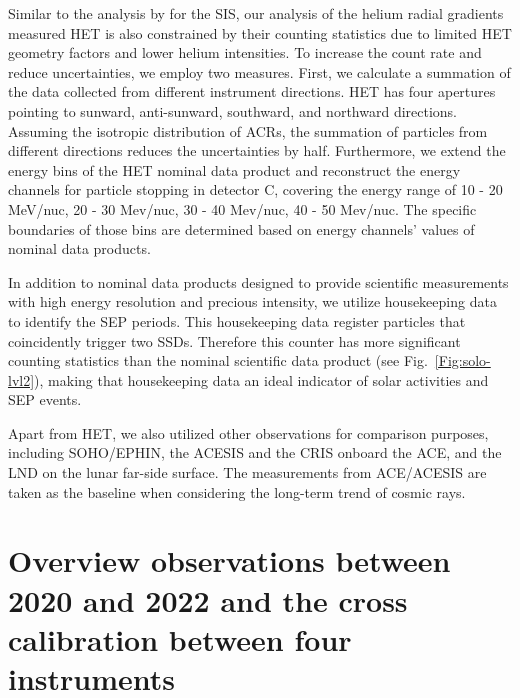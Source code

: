 Similar to the analysis by \citet{Mason-2021-SolOQuietTime} for the \ac{SIS}, our analysis of the helium radial gradients measured \ac{HET} is also constrained by their counting statistics due to limited \ac{HET} geometry factors and lower helium intensities. To increase the count rate and reduce uncertainties, we employ two measures. First, we calculate a summation of the data collected from different instrument directions. \ac{HET} has four apertures pointing to sunward, anti-sunward, southward, and northward directions. Assuming the isotropic distribution of \acp{ACR}, the summation of particles from different directions reduces the uncertainties by half. Furthermore, we extend the energy bins of the \ac{HET} nominal data product and reconstruct the energy channels for particle stopping in detector C, covering the energy range of 10 - 20 MeV/nuc, 20 - 30 Mev/nuc, 30 - 40 Mev/nuc, 40 - 50 Mev/nuc. The specific boundaries of those bins are determined based on energy channels' values of nominal data products.

In addition to nominal data products designed to provide scientific measurements with high energy resolution and precious intensity, we utilize housekeeping data to identify the \ac{SEP} periods. This housekeeping data register particles that coincidently trigger two \acp{SSD}. Therefore this counter has more significant counting statistics than the nominal scientific data product (see Fig.~\ref{Fig:solo-lvl2}), making that housekeeping data an ideal indicator of solar activities and \ac{SEP} events. 



Apart from \ac{HET}, we also utilized other observations for comparison purposes, including \ac{SOHO}/\ac{EPHIN}, the \ac{ACESIS} and the \ac{CRIS} onboard the \ac{ACE}, and the \ac{LND} on the lunar far-side surface. The measurements from \ac{ACE}/\ac{ACESIS} are taken as the baseline when considering the long-term trend of cosmic rays. 

\section{Overview observations between 2020 and 2022 and the cross calibration between four instruments}

